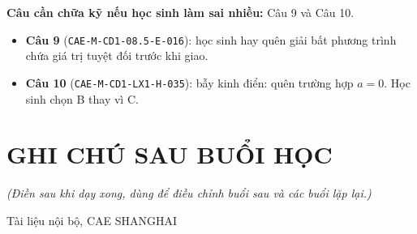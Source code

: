 \documentclass[11pt, a4paper]{article}
\begin{document}
\textbf{Câu cần chữa kỹ nếu học sinh làm sai nhiều:} Câu 9 và Câu 10.

\begin{itemize}[leftmargin=1.4em, itemsep=2pt]
\item \textbf{Câu 9} (\texttt{CAE-M-CD1-08.5-E-016}): học sinh hay quên giải bất phương trình chứa giá trị tuyệt đối trước khi giao.
\item \textbf{Câu 10} (\texttt{CAE-M-CD1-LX1-H-035}): bẫy kinh điển: quên trường hợp $a = 0$. Học sinh chọn B thay vì C.
\end{itemize}

\section{GHI CHÚ SAU BUỔI HỌC}

\emph{(Điền sau khi dạy xong, dùng để điều chỉnh buổi sau và các buổi lặp lại.)}

\vspace{0.8cm}
\begin{center}
{\footnotesize\color{cae_blue} Tài liệu nội bộ, CAE SHANGHAI}
\end{center}
\end{document}
